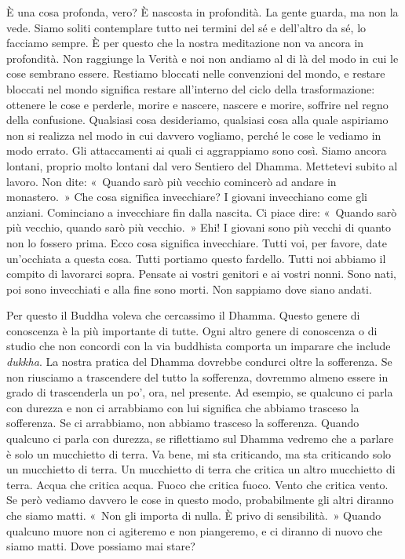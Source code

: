 È una cosa profonda, vero? È nascosta in profondità. La gente guarda, ma
non la vede. Siamo soliti contemplare tutto nei termini del sé e
dell'altro da sé, lo facciamo sempre. È per questo che la nostra
meditazione non va ancora in profondità. Non raggiunge la Verità e noi
non andiamo al di là del modo in cui le cose sembrano essere. Restiamo
bloccati nelle convenzioni del mondo, e restare bloccati nel mondo
significa restare all'interno del ciclo della trasformazione: ottenere
le cose e perderle, morire e nascere, nascere e morire, soffrire nel
regno della confusione. Qualsiasi cosa desideriamo, qualsiasi cosa alla
quale aspiriamo non si realizza nel modo in cui davvero vogliamo, perché
le cose le vediamo in modo errato. Gli attaccamenti ai quali ci
aggrappiamo sono così. Siamo ancora lontani, proprio molto lontani dal
vero Sentiero del Dhamma. Mettetevi subito al lavoro. Non dite: «~Quando
sarò più vecchio comincerò ad andare in monastero.~» Che cosa significa
invecchiare? I giovani invecchiano come gli anziani. Cominciano a
invecchiare fin dalla nascita. Ci piace dire: «~Quando sarò più vecchio,
quando sarò più vecchio.~» Ehi! I giovani sono più vecchi di quanto non
lo fossero prima. Ecco cosa significa invecchiare. Tutti voi, per
favore, date un'occhiata a questa cosa. Tutti portiamo questo fardello.
Tutti noi abbiamo il compito di lavorarci sopra. Pensate ai vostri
genitori e ai vostri nonni. Sono nati, poi sono invecchiati e alla fine
sono morti. Non sappiamo dove siano andati.

Per questo il Buddha voleva che cercassimo il Dhamma. Questo genere di
conoscenza è la più importante di tutte. Ogni altro genere di conoscenza
o di studio che non concordi con la via buddhista comporta un imparare
che include \emph{dukkha}. La nostra pratica del Dhamma dovrebbe
condurci oltre la sofferenza. Se non riusciamo a trascendere del tutto
la sofferenza, dovremmo almeno essere in grado di trascenderla un po',
ora, nel presente. Ad esempio, se qualcuno ci parla con durezza e non ci
arrabbiamo con lui significa che abbiamo trasceso la sofferenza. Se ci
arrabbiamo, non abbiamo trasceso la sofferenza. Quando qualcuno ci parla
con durezza, se riflettiamo sul Dhamma vedremo che a parlare è solo un
mucchietto di terra. Va bene, mi sta criticando, ma sta criticando solo
un mucchietto di terra. Un mucchietto di terra che critica un altro
mucchietto di terra. Acqua che critica acqua. Fuoco che critica fuoco.
Vento che critica vento. Se però vediamo davvero le cose in questo modo,
probabilmente gli altri diranno che siamo matti. «~Non gli importa di
nulla. È privo di sensibilità.~» Quando qualcuno muore non ci agiteremo
e non piangeremo, e ci diranno di nuovo che siamo matti. Dove possiamo
mai stare?

